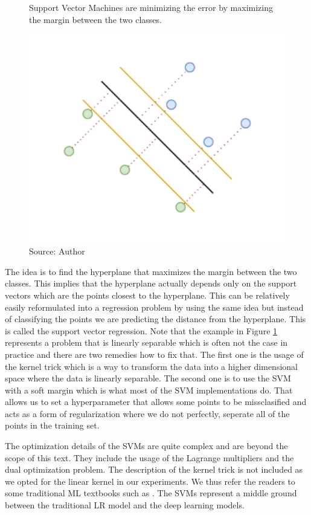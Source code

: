 \begin{figure}[!h]
    \centering
    \caption{Support Vector Machines are minimizing
    the error by maximizing the margin between the two classes.}
    \includegraphics[width=1\textwidth]{Figures/SVM_idea.drawio.pdf}
    \caption*{Source: Author}
    \label{fig:svm}
\end{figure}


The idea is to find the hyperplane that maximizes the margin between the two classes.
This implies that the hyperplane actually depends only on the support vectors which are the points
closest to the hyperplane. This can be relatively easily reformulated
into a regression problem by using the same idea but instead of classifying the points
we are predicting the distance from the hyperplane. This is called the support vector regression.
Note that the example in Figure \ref{fig:svm} represents a problem that is linearly separable
which is often not the case in practice and there are two remedies how to fix that.
The first one is the usage of the kernel trick which is a way to transform the data into a higher dimensional space
where the data is linearly separable. The second one is to use the \ac{SVM} with a soft margin which is
what most of the \ac{SVM} implementations do. That allows us to set a hyperparameter that allows
some points to be missclasified and acts as a form of regularization where we do not perfectly,
seperate all of the points in the training set. 


The optimization details of the \ac{SVM}s are quite complex and are beyond the scope of this text.
They include the usage of the Lagrange multipliers and the dual optimization problem. The description
of the kernel trick is not included as we opted for the linear kernel in our experiments.
We thus refer the readers to some traditional \ac{ML} textbooks such as \cite{bishop2006pattern}.
The \ac{SVM}s represent a middle ground between the traditional \ac{LR} model and the deep learning models.



